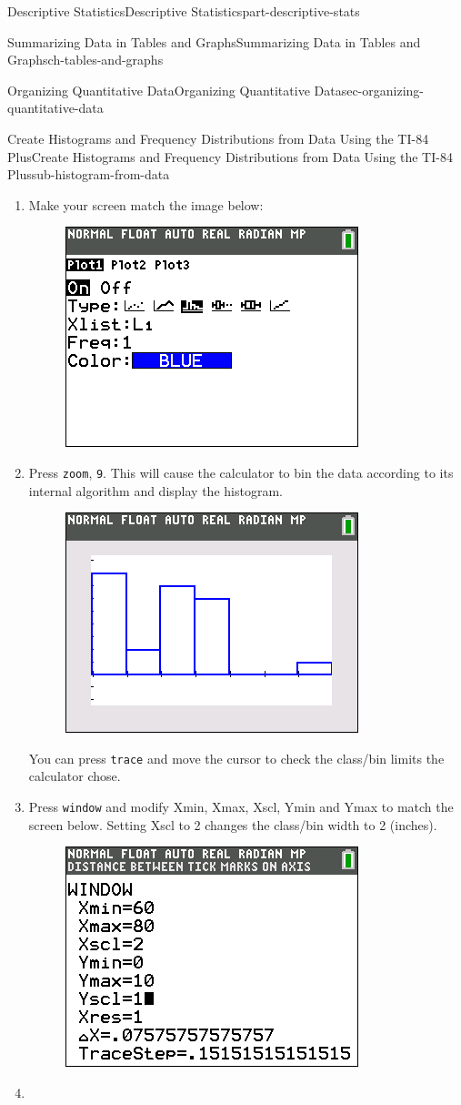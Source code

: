 \documentclass[oneside,10pt,]{book}
\newcommand{\mono}[1]{\texttt{#1}}
\numberwithin{equation}{section}
\begin{document}
\begin{partptx}{Descriptive Statistics}{}{Descriptive Statistics}{}{}{part-descriptive-stats}
\begin{chapterptx}{Summarizing Data in Tables and Graphs}{}{Summarizing Data in Tables and Graphs}{}{}{ch-tables-and-graphs}
\begin{sectionptx}{Organizing Quantitative Data}{}{Organizing Quantitative Data}{}{}{sec-organizing-quantitative-data}
\begin{subsectionptx}{Create Histograms and Frequency Distributions from Data Using the TI-84 Plus}{}{Create Histograms and Frequency Distributions from Data Using the TI-84 Plus}{}{}{sub-histogram-from-data}
\begin{enumerate}
\begin{figure}
\end{figure}\item\hypertarget{li-29}{}\hypertarget{p-54}{}%
Make your screen match the image below:%
\begin{figure}\centering\includegraphics[width=0.4\linewidth]{images/stat-plot-histogram-from-list.png}
\end{figure}\item\hypertarget{li-30}{}\hypertarget{p-55}{}%
Press \mono{zoom}, \mono{9}. This will cause the calculator to bin the data according to its internal algorithm and display the histogram.%
\begin{figure}\centering\includegraphics[width=0.4\linewidth]{images/heights-histogram-1.png}
\end{figure}\hypertarget{p-56}{}%
You can press \mono{trace} and move the cursor to check the class\slash{}bin limits the calculator chose.%
\item\hypertarget{li-31}{}\hypertarget{p-57}{}%
Press \mono{window} and modify Xmin, Xmax, Xscl, Ymin and Ymax to match the screen below. Setting Xscl to 2 changes the class\slash{}bin width to 2 (inches).%
\begin{figure}\centering\includegraphics[width=0.4\linewidth]{images/heights-histogram-window.png}
\end{figure}\item\hypertarget{li-32}{}\hypertarget{p-58}{}%

\end{enumerate}
\end{subsectionptx}
\end{sectionptx}
\end{chapterptx}
\end{partptx}
\end{document}
